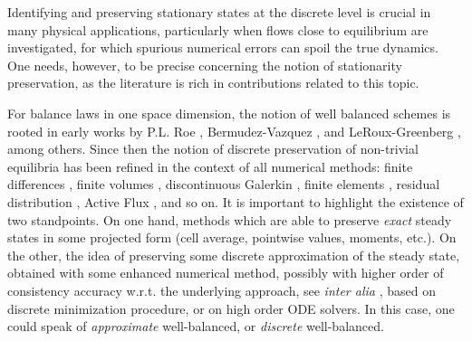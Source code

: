 \documentclass[a4paper,10pt]{article}
\begin{document}
Identifying and preserving stationary states at the discrete level is crucial in many physical applications, 
particularly when flows close to equilibrium are investigated, for which  spurious numerical errors can spoil the true dynamics. 
One needs, however, to be precise concerning the notion of stationarity preservation, 
as the literature is rich in contributions related to this topic. 

For balance laws in one space dimension, the notion of well balanced schemes is rooted in early works
by P.L. Roe \cite{Roe87},  Bermudez-Vazquez \cite{bv94}, and  LeRoux-Greenberg \cite{doi:10.1137/0733001}, among others. 
Since then the notion of discrete  preservation of non-trivial equilibria  has  been 
refined in the context of all numerical methods: finite  differences
\cite{Li2015,Li2020,Xu2025,Wang2022,Zhang2023,Ren2024}, finite volumes  \cite{Audusse2004,Castro2008,Noelle2007,Kurganov2020,Ciallella2022,Chertock2022,Ciallella2023,Zhang2025}, 
discontinuous Galerkin    \cite{Xing2014,Liu2022,Zhang2023,Zhang2025,Yang2021,mantri2024fully},  finite elements 
\cite{Azerad2017,Guermond2018,Behzadi2020, Knobloch2024,Micalizzi2024}, residual distribution   
\cite{Ricchiuto2009,Chang2023,Ricchiuto2015,Ricchiuto2011,Arpaia2018,Arpaia2020}, Active Flux  \cite{Barsukow2024,Abgrall2024,Liu2025}, and so on.
It is important to highlight the existence of two standpoints. 
On one hand, methods which are able to preserve \textit{exact} steady states in some projected form (cell average, pointwise values, moments, etc.).
On the other, the idea of preserving some discrete approximation of the steady state, obtained with some enhanced numerical method,
possibly with higher order of consistency accuracy w.r.t. the underlying approach, see \emph{inter alia} 
\cite{math9151799,GOMEZBUENO2021125820,GOMEZBUENO202318,Ciallella2023,Mantri2024,Kazolea2025,AbgLiuRic25},  based on  discrete minimization procedure, or on high order ODE solvers. 
In this case, one could speak of \textit{approximate} well-balanced, or \textit{discrete} well-balanced.\\
\end{document}
